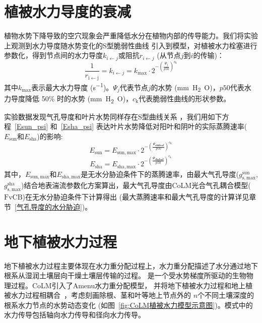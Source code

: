 \section{植被水力导度的衰减}\label{植被水力导度的衰减}
植物水势下降导致的空穴现象会严重降低水分在植物内部的传导能力。我们将实验上观测到水力导度随水势变化的S型脆弱性曲线 
\citep{sperry1988method,gentine2016allometry,neufeld1992genotypic,pammenter1998mathematical,plaut2012hydraulic}
引入到模型，对植被水力栓塞进行参数化，得到节点间的水力导度$k_{i\gets j}$或阻抗$r_{i\gets j}$ (从节点$j$到$i$的传输)：
\begin{equation}\label{kij}
  \frac{1}{r_{\mathrm{i\gets j}}} = k_{i\gets j}=k_{\mathrm{max}} \cdot 2^{-\left(\frac{\Psi_{j}}{p 50}\right)^{c_{\mathrm{k}}}}
\end{equation}
其中$k_{\mathrm{max}}$表示最大水力导度 (\unit{s^{-1}})。$\Psi_j$代表节点$j$的水势 (\unit{mm.H_2O})，$p50$代表水力导度降低 50\% 时的水势 (\unit{mm.H_2O})，$c_{\mathrm {k}}$代表脆弱性曲线的形状参数。


实验数据发现气孔导度和叶片水势同样存在S型曲线关系 \citep{kennedy2019implementing,klein2014variability}，我们用如下方程~\eqref{Esun_psi} 和~\eqref{Esha_psi} 表达叶片水势降低对阳叶和阴叶的实际蒸腾速率($E_{\mathrm{sun}}$和$E_{\mathrm{sha}}$)的影响:
\begin{equation}\label{Esun_psi}
  E_{\mathrm{sun}}=E_{\mathrm{sun,max}} \cdot 2^{-\left(\frac{\Psi_{\mathrm{\mathbf{sunleaf}}}}{p 50}\right)^{c_{\mathrm{k}}}}
\end{equation}
\begin{equation}\label{Esha_psi}
  E_{\mathrm{sha}}=E_{\mathrm{sha,max}} \cdot 2^{-\left(\frac{\Psi_{\mathrm{\mathbf{shaleaf}}}}{p 50}\right)^{c_{\mathrm{k}}}}
\end{equation}
其中，$E_{\mathrm{sun,max}}$和$E_{\mathrm{sha,max}}$是无水分胁迫条件下的蒸腾速率，由最大气孔导度($g_{\mathrm{s,max}}^{\mathrm {sun}}$, $g_{\mathrm{s,max}}^{\mathrm {sha}}$)结合地表湍流参数化方案算出，最大气孔导度由CoLM光合气孔耦合模型(${\mathrm {FvCB}}$)在无水分胁迫条件下计算得出 (最大蒸腾速率和最大气孔导度的计算详见章节~\ref{气孔导度的水分胁迫})。


\section{地下植被水力过程}\label{地下植被水力过程}
地下植被水力过程主要体现在水力重分配过程上，水力重分配描述了水分通过地下根系从湿润土壤层向干燥土壤层传输的过程。
是一个受水势梯度所驱动的生物物理过程。CoLM引入了Amenu水力重分配模型\citep{amenu2008,zhu2017incorporating}，
并将地下植被水力过程和地上植被水力过程相耦合~\citep{li2021new}，考虑刻画除根、茎和叶等地上节点外的
$n$个不同土壤深度的根系水力节点的水势动态变化 (如图~\ref{fig:CoLM植被水力模型示意图})。模式中的水力传导包括轴向水力传导和径向水力传导。

